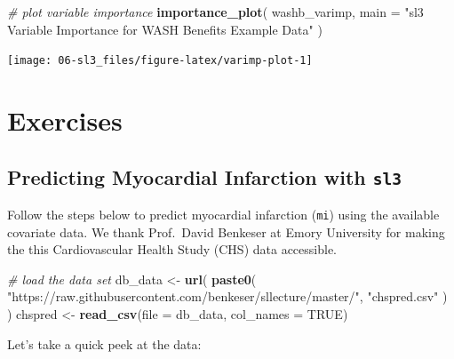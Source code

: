 \documentclass[12pt, krantz2,]{book}
\newenvironment{Shaded}{\begin{snugshade}}{\end{snugshade}}
\newcommand{\CommentTok}[1]{\textcolor[rgb]{0.56,0.35,0.01}{\textit{#1}}}
\newcommand{\DataTypeTok}[1]{\textcolor[rgb]{0.13,0.29,0.53}{#1}}
\newcommand{\KeywordTok}[1]{\textcolor[rgb]{0.13,0.29,0.53}{\textbf{#1}}}
\newcommand{\NormalTok}[1]{#1}
\newcommand{\OtherTok}[1]{\textcolor[rgb]{0.56,0.35,0.01}{#1}}
\newcommand{\StringTok}[1]{\textcolor[rgb]{0.31,0.60,0.02}{#1}}
\theoremstyle{definition}
\theoremstyle{definition}
\theoremstyle{definition}
\newcommand{\1}{\mathbbm{1}}
\begin{document}
\begin{Shaded}
\begin{Highlighting}[]
\CommentTok{# plot variable importance}
\KeywordTok{importance_plot}\NormalTok{(}
\NormalTok{  washb_varimp,}
  \DataTypeTok{main =} \StringTok{"sl3 Variable Importance for WASH Benefits Example Data"}
\NormalTok{)}
\end{Highlighting}
\end{Shaded}

\begin{center}\texttt{[image: 06-sl3\_files/figure-latex/varimp-plot-1]} \end{center}

\hypertarget{sl3-exercises}{%
\section{Exercises}\label{sl3-exercises}}

\hypertarget{sl3ex1}{%
\subsection{\texorpdfstring{Predicting Myocardial Infarction with \texttt{sl3}}{Predicting Myocardial Infarction with sl3}}\label{sl3ex1}}

Follow the steps below to predict myocardial infarction (\texttt{mi}) using the
available covariate data. We thank Prof.~David Benkeser at Emory University for
making the this Cardiovascular Health Study (CHS) data accessible.

\begin{Shaded}
\begin{Highlighting}[]
\CommentTok{# load the data set}
\NormalTok{db_data <-}\StringTok{ }\KeywordTok{url}\NormalTok{(}
  \KeywordTok{paste0}\NormalTok{(}
    \StringTok{"https://raw.githubusercontent.com/benkeser/sllecture/master/"}\NormalTok{,}
    \StringTok{"chspred.csv"}
\NormalTok{  )}
\NormalTok{)}
\NormalTok{chspred <-}\StringTok{ }\KeywordTok{read_csv}\NormalTok{(}\DataTypeTok{file =}\NormalTok{ db_data, }\DataTypeTok{col_names =} \OtherTok{TRUE}\NormalTok{)}
\end{Highlighting}
\end{Shaded}

Let's take a quick peek at the data:
\end{document}
